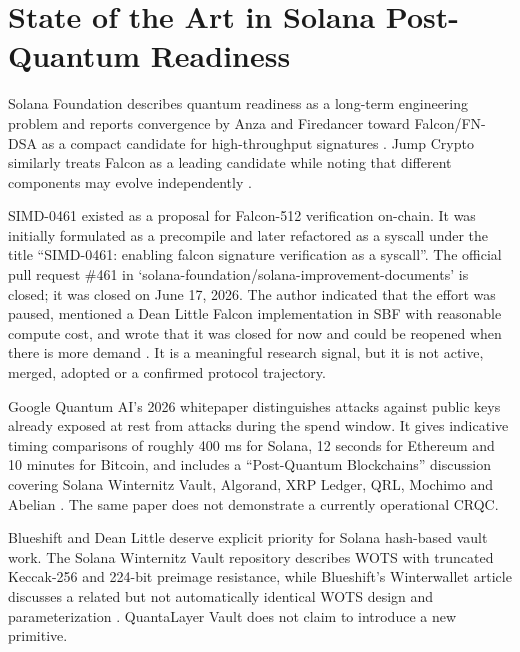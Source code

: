 \documentclass[11pt,a4paper,oneside,parskip=false]{scrartcl}
\begin{document}
\section{State of the Art in Solana Post-Quantum Readiness}

Solana Foundation describes quantum readiness as a long-term engineering problem and reports convergence by Anza and Firedancer toward Falcon/FN-DSA as a compact candidate for high-throughput signatures \cite{solana-quantum-readiness,anza-quantum-adversary}. Jump Crypto similarly treats Falcon as a leading candidate while noting that different components may evolve independently \cite{jump-quantum-migration-paths}.

SIMD-0461 existed as a proposal for Falcon-512 verification on-chain. It was initially formulated as a precompile and later refactored as a syscall under the title \enquote{SIMD-0461: enabling falcon signature verification as a syscall}. The official pull request \#461 in `solana-foundation/solana-improvement-documents' is closed; it was closed on June 17, 2026. The author indicated that the effort was paused, mentioned a Dean Little Falcon implementation in SBF with reasonable compute cost, and wrote that it was closed for now and could be reopened when there is more demand \cite{simd0461-pr}. It is a meaningful research signal, but it is not active, merged, adopted or a confirmed protocol trajectory.

Google Quantum AI's 2026 whitepaper distinguishes attacks against public keys already exposed at rest from attacks during the spend window. It gives indicative timing comparisons of roughly 400 ms for Solana, 12 seconds for Ethereum and 10 minutes for Bitcoin, and includes a \enquote{Post-Quantum Blockchains} discussion covering Solana Winternitz Vault, Algorand, XRP Ledger, QRL, Mochimo and Abelian \cite{google-quantum-ai-crypto-2026}. The same paper does not demonstrate a currently operational CRQC.

Blueshift and Dean Little deserve explicit priority for Solana hash-based vault work. The Solana Winternitz Vault repository describes WOTS with truncated Keccak-256 and 224-bit preimage resistance, while Blueshift's Winterwallet article discusses a related but not automatically identical WOTS design and parameterization \cite{blueshift-winternitz-vault-github,blueshift-quantum-proofing-solana,blueshift-winternitz-course}. QuantaLayer Vault does not claim to introduce a new primitive.
\end{document}
